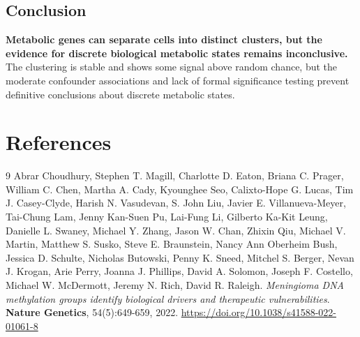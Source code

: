 \documentclass[12pt, a4paper]{article}
\begin{document}
\subsection{Conclusion}
\textbf{Metabolic genes can separate cells into distinct clusters, but the evidence for discrete biological metabolic states remains inconclusive.} The clustering is stable and shows some signal above random chance, but the moderate confounder associations and lack of formal significance testing prevent definitive conclusions about discrete metabolic states.

\section{References}
\begin{thebibliography}{9}
Abrar Choudhury, Stephen T. Magill, Charlotte D. Eaton, Briana C. Prager, William C. Chen, Martha A. Cady, Kyounghee Seo, Calixto-Hope G. Lucas, Tim J. Casey-Clyde, Harish N. Vasudevan, S. John Liu, Javier E. Villanueva-Meyer, Tai-Chung Lam, Jenny Kan-Suen Pu, Lai-Fung Li, Gilberto Ka-Kit Leung, Danielle L. Swaney, Michael Y. Zhang, Jason W. Chan, Zhixin Qiu, Michael V. Martin, Matthew S. Susko, Steve E. Braunstein, Nancy Ann Oberheim Bush, Jessica D. Schulte, Nicholas Butowski, Penny K. Sneed, Mitchel S. Berger, Nevan J. Krogan, Arie Perry, Joanna J. Phillips, David A. Solomon, Joseph F. Costello, Michael W. McDermott, Jeremy N. Rich, David R. Raleigh.
\textit{Meningioma DNA methylation groups identify biological drivers and therapeutic vulnerabilities}.
\textbf{Nature Genetics}, 54(5):649-659, 2022.
\url{https://doi.org/10.1038/s41588-022-01061-8}
\end{thebibliography}
\end{document}
